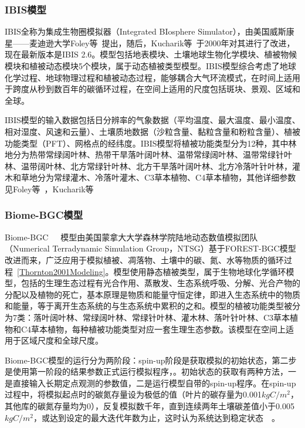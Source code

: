 \subsubsection{IBIS模型}
IBIS全称为集成生物圈模拟器（Integrated BIosphere Simulator），由美国威斯康星——麦迪逊大学Foley等~\cite{foley1996integrated}提出，随后，Kucharik等~\cite{kucharik2000testing}于2000年对其进行了改进，现在最新版本是IBIS 2.6。模型包括地表模块、土壤地球生物化学模块、植被物候模块和植被动态模块5个模块，属于动态植被类型模型。IBIS模型综合考虑了地球化学过程、地球物理过程和植被动态过程，能够耦合大气环流模式，在时间上适用于跨度从秒到数百年的碳循环过程，在空间上适用的尺度包括斑块、景观、区域和全球。

IBIS模型的输入数据包括日分辨率的气象数据（平均温度、最大温度、最小温度、相对湿度、风速和云量）、土壤质地数据（沙粒含量、黏粒含量和粉粒含量）、植被功能类型（PFT）、网格点的经纬度。IBIS模型将植被功能类型分为12种，其中林地分为热带常绿阔叶林、热带干旱落叶阔叶林、温带常绿阔叶林、温带常绿针叶林、温带阔叶林、北方常绿针叶林、北方干旱落叶阔叶林、北方冷落叶针叶林，灌木和草地分为常绿灌木、冷落叶灌木、C3草本植物、C4草本植物，其他详细参数见Foley等~\cite{foley1996integrated}，Kucharik等~\cite{kucharik2000testing}

\subsubsection{Biome-BGC模型}
Biome-BGC~\cite{thornton1998regional}~\cite{kimball1997simulating}~\cite{white2000parameterization}模型由美国蒙拿大大学森林学院陆地动态数值模拟团队（Numerical Terradynamic Simulation Group，NTSG）基于FOREST-BGC模型改进而来，广泛应用于模拟植被、凋落物、土壤中的碳、氮、水等物质的循环过程~\ref{Thornton2001Modeling}。模型使用静态植被类型，属于生物地球化学循环模型，包括的生理生态过程有光合作用、蒸散发、生态系统呼吸、分解、光合产物的分配以及植物的死亡，基本原理是物质和能量守恒定律，即进入生态系统中的物质和能量，等于离开生态系统的与生态系统中累积的之和。模型的植被功能类型被分为7类：落叶阔叶林、常绿阔叶林、常绿针叶林、灌木林、落叶针叶林、C3草本植物和C4草本植物，每种植被功能类型对应一套生理生态参数。该模型在空间上适用于区域尺度和全球尺度。

Biome-BGC模型的运行分为两阶段：spin-up阶段是获取模拟的初始状态，第二步是使用第一阶段的结果参数正式运行模拟程序，。初始状态的获取有两种方法，一是直接输入长期定点观测的参数值，二是运行模型自带的spin-up程序。在spin-up过程中，将模拟起点时的碳氮存量设为极低的值（叶片的碳存量为0.001$kg C/m^2$，其他库的碳氮存量均为0），反复模拟数千年，直到连续两年土壤碳差值小于0.005$kg C/m^2$，或达到设定的最大迭代年数为止，这时认为系统达到稳定状态~\cite{thornton2005ecosystem}~\cite{pietsch2005bgc}。


